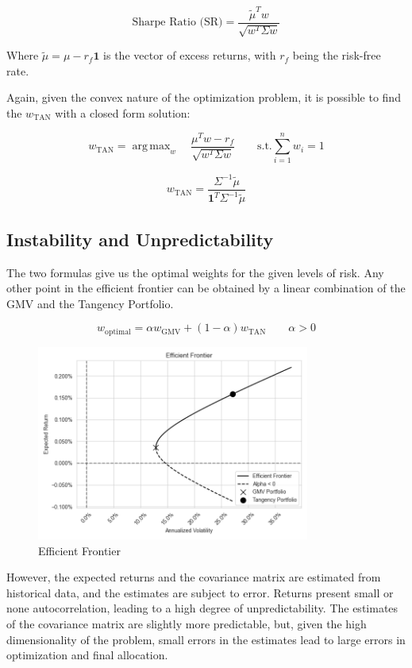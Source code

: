 \documentclass{article}
\DeclareMathOperator*{\argmax}{arg\,max}
\begin{document}
$$
\text{Sharpe Ratio (SR)} = \frac{\tilde{\mu}^{T} w}{\sqrt{w^{T} \Sigma w}}
$$

Where $\tilde{\mu} = \mu - r_f \mathbf{1}$ is the vector of excess returns, with $r_f$ being the risk-free rate.

Again, given the convex nature of the optimization problem, it is possible to find the $w_{\text{TAN}}$ with a closed form solution:

$$
w_{\text{TAN}} = \argmax_{w} \quad \frac{\mu^{T} w - r_f}{\sqrt{w^{T} \Sigma w}} \quad \quad
\text{s.t.} \sum_{i=1}^{n} w_{i} = 1
$$

$$
w_{\text{TAN}} = \frac{\Sigma^{-1} \tilde{\mu}}{\mathbf{1}^{T} \Sigma^{-1} \tilde{\mu}}
$$

\subsection{Instability and Unpredictability}
The two formulas give us the optimal weights for the given levels of risk. Any other point in the efficient frontier can be obtained by a linear combination of the GMV and the Tangency Portfolio.

$$
w_{\text{optimal}} = \alpha w_{\text{GMV}} + (1 - \alpha) w_{\text{TAN}} \quad \quad \alpha > 0
$$

\begin{figure}[h]
    \centering
    \includegraphics[width=0.8\textwidth]{graphics/report_efficient_frontier.png}
    \caption{Efficient Frontier}
    \label{fig:efficient_frontier}
\end{figure}

However, the expected returns and the covariance matrix are estimated from historical data, and the estimates are subject to error. Returns present small or none autocorrelation, leading to a high degree of unpredictability. The estimates of the covariance matrix are slightly more predictable, but, given the high dimensionality of the problem, small errors in the estimates lead to large errors in optimization and final allocation.
\end{document}

